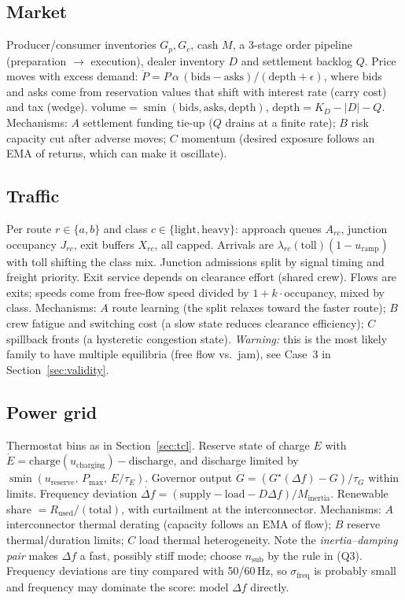 \documentclass[11pt]{article}
\theoremstyle{plain}
\theoremstyle{definition}
\theoremstyle{remark}
\newcommand{\abs}[1]{\left\lvert #1 \right\rvert}
\newcommand{\softmin}{\operatorname{smin}}
\begin{document}
\subsection{Market}
Producer/consumer inventories $G_p,G_c$, cash $M$, a 3-stage order pipeline (preparation $\to$ execution), dealer inventory $D$ and settlement backlog $Q$. Price moves with excess demand: $\dot P=P\,\alpha\,(\text{bids}-\text{asks})/(\text{depth}+\epsilon)$, where bids and asks come from reservation values that shift with interest rate (carry cost) and tax (wedge). $\text{volume}=\softmin(\text{bids},\text{asks},\text{depth})$, $\text{depth}=K_D-\abs{D}-Q$. Mechanisms: $A$ settlement funding tie-up ($Q$ drains at a finite rate); $B$ risk capacity cut after adverse moves; $C$ momentum (desired exposure follows an EMA of returns, which can make it oscillate).

\subsection{Traffic}
Per route $r\in\{a,b\}$ and class $c\in\{\text{light},\text{heavy}\}$: approach queues $A_{rc}$, junction occupancy $J_{rc}$, exit buffers $X_{rc}$, all capped. Arrivals are $\lambda_{rc}(\text{toll})(1-u_{\text{ramp}})$ with toll shifting the class mix. Junction admissions split by signal timing and freight priority. Exit service depends on clearance effort (shared crew). Flows are exits; speeds come from free-flow speed divided by $1+k\cdot$occupancy, mixed by class. Mechanisms: $A$ route learning (the split relaxes toward the faster route); $B$ crew fatigue and switching cost (a slow state reduces clearance efficiency); $C$ spillback fronts (a hysteretic congestion state). \emph{Warning:} this is the most likely family to have multiple equilibria (free flow vs.\ jam), see Case~3 in Section~\ref{sec:validity}.

\subsection{Power grid}
Thermostat bins as in Section~\ref{sec:tcl}. Reserve state of charge $E$ with $\dot E=\text{charge}(u_{\text{charging}})-\text{discharge}$, and discharge limited by $\softmin(u_{\text{reserve}},\,P_{\max},\,E/\tau_E)$. Governor output $\dot G=(G^\star(\Delta f)-G)/\tau_G$ within limits. Frequency deviation $\dot{\Delta f}=(\text{supply}-\text{load}-D\Delta f)/M_{\text{inertia}}$. Renewable share $=R_{\text{used}}/(\text{total})$, with curtailment at the interconnector. Mechanisms: $A$ interconnector thermal derating (capacity follows an EMA of flow); $B$ reserve thermal/duration limits; $C$ load thermal heterogeneity. Note the \emph{inertia--damping pair} makes $\Delta f$ a fast, possibly stiff mode; choose $n_{\text{sub}}$ by the rule in (Q3). Frequency deviations are tiny compared with 50/60\,Hz, so $\sigma_{\text{freq}}$ is probably small and frequency may dominate the score: model $\Delta f$ directly.
\end{document}
